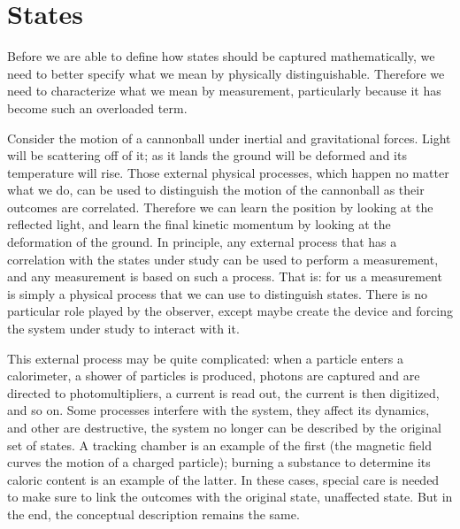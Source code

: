 \documentclass[aps,pra,10pt,twocolumn,floatfix,nofootinbib]{revtex4-1}
\theoremstyle{definition}
\begin{document}
\section{States}




Before we are able to define how states should be captured mathematically, we need to better specify what we mean by physically distinguishable. Therefore we need to characterize what we mean by measurement, particularly because it has become such an overloaded term.

Consider the motion of a cannonball under inertial and gravitational forces. Light will be scattering off of it; as it lands the ground will be deformed and its temperature will rise. Those external physical processes, which happen no matter what we do, can be used to distinguish the motion of the cannonball as their outcomes are correlated. Therefore we can learn the position by looking at the reflected light, and learn the final kinetic momentum by looking at the deformation of the ground. In principle, any external process that has a correlation with the states under study can be used to perform a measurement, and any measurement is based on such a process. That is: for us a measurement is simply a physical process that we can use to distinguish states. There is no particular role played by the observer, except maybe create the device and forcing the system under study to interact with it.

This external process may be quite complicated: when a particle enters a calorimeter, a shower of particles is produced, photons are captured and are directed to photomultipliers, a current is read out, the current is then digitized, and so on. Some processes interfere with the system, they affect its dynamics, and other are destructive, the system no longer can be described by the original set of states. A tracking chamber is an example of the first (the magnetic field curves the motion of a charged particle); burning a substance to determine its caloric content is an example of the latter. In these cases, special care is needed to make sure to link the outcomes with the original state, unaffected state. But in the end, the conceptual description remains the same.
\end{document}
